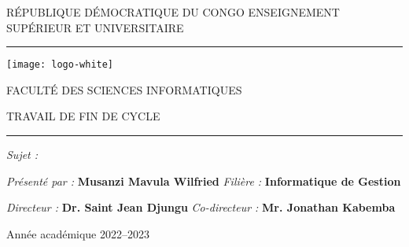 \begingroup
\begin{center}
    \Large{\uppercase{République Démocratique du Congo Enseignement Supérieur et Universitaire}}

    \vspace{0.6cm}
    \hrule
    \vspace{0.6cm}

    \texttt{[image: logo-white]}

    \vspace{0.6cm}
    \uppercase{Faculté des Sciences informatiques}

    \vspace{0.2cm}
    \uppercase{\Large{Travail de fin de cycle}} \linebreak

    \hrule

    \vspace{3cm}
    \textit{\Large{Sujet :}} {\textbf{\Large{}}}

    \vspace{3cm}
    \large
    \begin{flushleft}
        \textit{Présenté par :} \textbf{Musanzi Mavula Wilfried} \linebreak
        \textit{Filière :} \textbf{Informatique de Gestion}
    \end{flushleft}

    \vspace{1cm}
    \begin{flushright}
        \textit{Directeur :} \textbf{Dr. Saint Jean Djungu} \linebreak
        \textit{Co-directeur : } \textbf{Mr. Jonathan Kabemba}
    \end{flushright}
    
    \vfill
    Année académique 2022--2023
\end{center}
\endgroup




